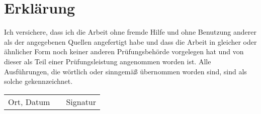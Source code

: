 \chapter*{Erklärung}

Ich versichere, dass ich die Arbeit ohne fremde Hilfe und ohne Benutzung anderer als der
angegebenen Quellen angefertigt habe und dass die Arbeit in gleicher oder ähnlicher Form
noch keiner anderen Prüfungsbehörde vorgelegen hat und von dieser als Teil einer
Prüfungsleistung angenommen worden ist. Alle Ausführungen, die wörtlich oder sinngemäß übernommen worden sind, sind als solche ge\-kenn\-zeich\-net.

\vspace{40pt}

\begin{center}
  \begin{tabular}{l p{} r}
    \cline{1-1} \cline{3-3}
    \begin{minipage}[t]{0.4\textwidth}
      \centering
      Ort, Datum
    \end{minipage}
    &
    \begin{minipage}[t]{0.2\textwidth}
    \end{minipage}
    &
    \begin{minipage}[t]{0.4\textwidth}
      \centering
      Signatur
    \end{minipage}
  \end{tabular}
\end{center}
